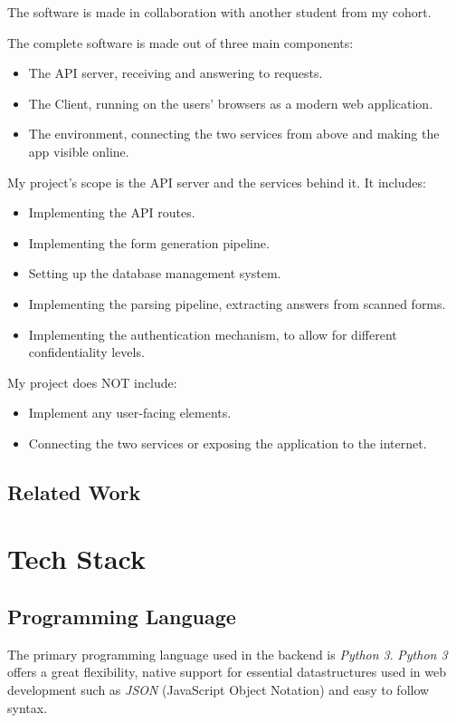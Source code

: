 \documentclass[12pt, a4paper]{report}
\begin{document}
The software is made in collaboration with another student from my cohort.

The complete software is made out of three main components:
\begin{itemize}
    \item The API server, receiving and answering to requests.
    \item The Client, running on the users' browsers as a modern web application.
    \item The environment, connecting the two services from above and making the app visible online.
\end{itemize}

My project's scope is the API server and the services behind it. It includes:
\begin{itemize}
    \item Implementing the API routes.
    \item Implementing the form generation pipeline.
    \item Setting up the database management system.
    \item Implementing the parsing pipeline, extracting answers from scanned forms.
    \item Implementing the authentication mechanism, to allow for different confidentiality levels.
\end{itemize}

My project does NOT include:
\begin{itemize}
    \item Implement any user-facing elements.
    \item Connecting the two services or exposing the application to the internet.
\end{itemize}


\section{Related Work}


\chapter{Tech Stack}

\section{Programming Language}

The primary programming language used in the backend is \textit{Python 3}.
\textit{Python 3} offers a great flexibility, native support for essential datastructures used in web development such as \textit{JSON} (JavaScript Object Notation) and easy to follow syntax.
\end{document}
